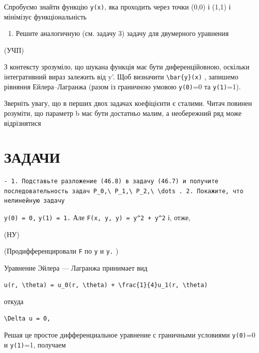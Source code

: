 \documentclass[
  ukrainian,
]{article}
\providecommand{\tightlist}{%
  \setlength{\itemsep}{0pt}\setlength{\parskip}{0pt}}
\begin{document}
Спробуємо знайти функцію \texttt{y(x)}, яка проходить через точки (0,0)
і (1,1) і мінімізує функціональність

\begin{enumerate}
\def\labelenumi{\arabic{enumi}.}
\setcounter{enumi}{3}
\tightlist
\item
  Решите аналогичную (см. задачу 3) задачу для двумерного уравнения
\end{enumerate}

(УЧП)

З контексту зрозуміло, що шукана функція має бути диференційовною,
оскільки інтегративний вираз залежить від y'. Щоб визначити
\texttt{\textbackslash{}bar\{y\}(x)} , запишемо рівняння
Ейлера--Лагранжа (разом із граничною умовою \texttt{y(0)}=0 та
\texttt{y(1)}=1).

Зверніть увагу, що в перших двох задачах коефіцієнти є сталими. Читач
повинен розуміти, що параметр b має бути достатньо малим, а необережний
ряд може відрізнятися

\section{ЗАДАЧИ}\label{ux437ux430ux434ux430ux447ux438-9}

\begin{verbatim}
- 1. Подставьте разложение (46.8) в задачу (46.7) и получите последовательность задач P_0,\ P_1,\ P_2,\ \dots . 2. Покажите, что нелинейную задачу
\end{verbatim}

\texttt{y(0)\ =\ 0,} \texttt{y(1)\ =\ 1.} Але
\texttt{F(x,\ y,\ y\textquotesingle{})\ =\ y\^{}2\ +\ y\textquotesingle{}\^{}2}
і, отже,

(НУ)

(Продифференцировали \texttt{F} по \texttt{y} и
\texttt{y\textquotesingle{}.} )

Уравнение Эйлера --- Лагранжа принимает вид

\begin{verbatim}
u(r, \theta) = u_0(r, \theta) + \frac{1}{4}u_1(r, \theta)
\end{verbatim}

откуда

\begin{verbatim}
\Delta u = 0,
\end{verbatim}

Решая це простое дифференциальное уравнение с граничными условиями
\texttt{y(0)}=0 и \texttt{y(1)}=1, получаем
\end{document}
